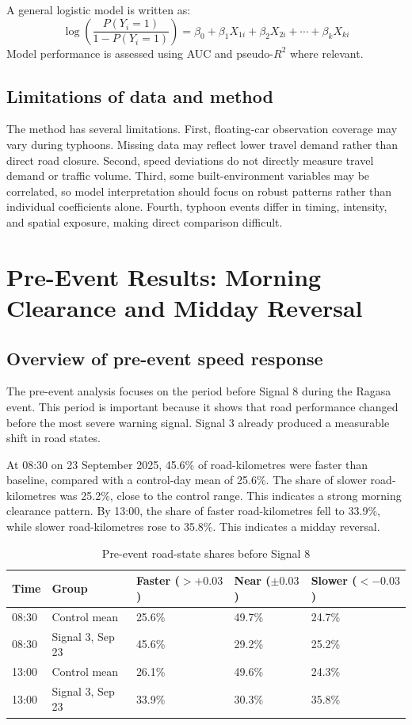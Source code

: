 \documentclass[12pt,a4paper]{report}
\begin{document}
A general logistic model is written as:
\begin{equation}
\log \left( \frac{P(Y_i=1)}{1-P(Y_i=1)} \right) = \beta_0 + \beta_1 X_{1i} + \beta_2 X_{2i} + \cdots + \beta_k X_{ki}
\end{equation}
Model performance is assessed using AUC and pseudo-$R^2$ where relevant.

\section{Limitations of data and method}
The method has several limitations. First, floating-car observation coverage may vary during typhoons. Missing data may reflect lower travel demand rather than direct road closure. Second, speed deviations do not directly measure travel demand or traffic volume. Third, some built-environment variables may be correlated, so model interpretation should focus on robust patterns rather than individual coefficients alone. Fourth, typhoon events differ in timing, intensity, and spatial exposure, making direct comparison difficult.

\chapter{Pre-Event Results: Morning Clearance and Midday Reversal}

\section{Overview of pre-event speed response}
The pre-event analysis focuses on the period before Signal 8 during the Ragasa event. This period is important because it shows that road performance changed before the most severe warning signal. Signal 3 already produced a measurable shift in road states.

At 08:30 on 23 September 2025, 45.6\% of road-kilometres were faster than baseline, compared with a control-day mean of 25.6\%. The share of slower road-kilometres was 25.2\%, close to the control range. This indicates a strong morning clearance pattern. By 13:00, the share of faster road-kilometres fell to 33.9\%, while slower road-kilometres rose to 35.8\%. This indicates a midday reversal.

\begin{table}[H]
\centering
\caption{Pre-event road-state shares before Signal 8}
\begin{tabular}{lllll}
\toprule
Time & Group & Faster ($>+0.03$) & Near ($\pm0.03$) & Slower ($<-0.03$) \\
\midrule
08:30 & Control mean & 25.6\% & 49.7\% & 24.7\% \\
08:30 & Signal 3, Sep 23 & 45.6\% & 29.2\% & 25.2\% \\
13:00 & Control mean & 26.1\% & 49.6\% & 24.3\% \\
13:00 & Signal 3, Sep 23 & 33.9\% & 30.3\% & 35.8\% \\
\bottomrule
\end{tabular}
\end{table}
\end{document}
